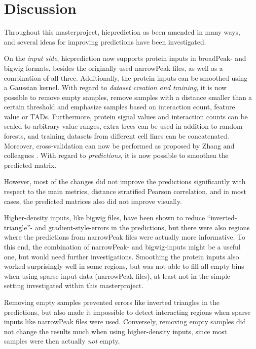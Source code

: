 \section{Discussion} \label{sec:discussion:main}
Throughout this masterproject, hicprediction as been amended in many ways,
and several ideas for improving predictions have been investigated.

On the \emph{input side}, hicprediction now supports protein inputs in broadPeak- and bigwig formats,
besides the originally used narrowPeak files, as well as a combination of all three.
Additionally, the protein inputs can be smoothed using a Gaussian kernel.
With regard to \emph{dataset creation and training}, it is now possible to
remove empty samples, remove samples with a distance smaller than a certain threshold 
and emphasize samples based on interaction count, feature value or TADs.
Furthermore, protein signal values and interaction counts can be scaled to arbitrary value ranges,
extra trees can be used in addition to random forests, and training datasets from different cell lines
can be concatenated. 
Moreover, cross-validation can now be performed as proposed by Zhang and colleagues \cite{Zhang2019}.
With regard to \emph{predictions}, it is now possible to smoothen the predicted matrix.

However, most of the changes did not improve the predictions significantly with respect
to the main metrics, distance stratified Pearson correlation,
and in most cases, the predicted matrices also did not improve visually.

Higher-density inputs, like bigwig files, 
have been shown to reduce ``inverted-triangle''- and gradient-style-errors in the predictions,
but there were also regions where the predictions from narrowPeak files 
were actually more informative.
To this end, the combination of narrowPeak- and bigwig-inputs might be a useful one,
but would need further investigations.
Smoothing the protein inputs also worked surprisingly well in some regions,
but was not able to fill all empty bins when using sparse input data (narrowPeak files),
at least not in the simple setting investigated within this masterproject.

Removing empty samples prevented errors like inverted triangles in the predictions,
but also made it impossible to detect interacting regions when sparse inputs like
narrowPeak files were used. 
Conversely, removing empty samples did not change the results much when using higher-density inputs, 
since most samples were then actually \emph{not} empty.

